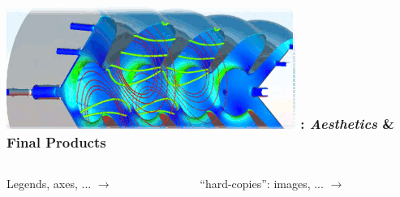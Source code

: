 \begin{frame}
\frametitle{\href{https://wci.llnl.gov/simulation/computer-codes/visit/}{\includegraphics[height=.85cm]{figs/visit-logos/VisIt-02}} \hspace{-.85cm}{\bf \textcolor{lightgray}{VisIt}}: \textit{Aesthetics} \& Final Products}
\begin{columns}
\begin{column}{5.75cm}
	\begin{beamerboxesrounded}[upper=block head,lower=block body,shadow=true]{\textcolor{DarkRed}{} Legends, axes, ...}
		\textcolor{DarkBlue}{} 
			$\rightarrow$ \framebox{\bf \textcolor{DarkBlue}{Annotantion...}}
	\end{beamerboxesrounded}
\end{column}
\begin{column}{5.5cm}
	\begin{beamerboxesrounded}[upper=block head,lower=block body,shadow=true]{\textcolor{DarkRed}{} ``hard-copies'': images, ...}
		\textcolor{DarkBlue}{} 
			$\rightarrow$ \framebox{\bf \textcolor{DarkBlue}{Save Window}}
	\end{beamerboxesrounded}

\end{column}
\end{columns}


\end{frame}
